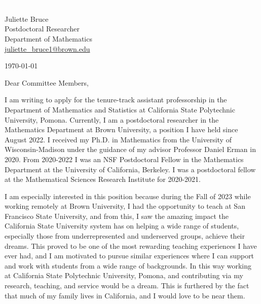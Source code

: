 \documentclass[11pt]{article}
\begin{document}
\section*{}

\noindent
\begin{minipage}{0.99\textwidth}
\begin{minipage}{0.69\textwidth}
\textcolor{white}{.}
\end{minipage}
\begin{minipage}{0.29\textwidth}
{
Juliette Bruce \\
Postdoctoral Researcher \\
Department of Mathematics \\
\href{mailto:juliette\_bruce1@brown.edu}{juliette\_bruce1@brown.edu}
}

\vspace{12pt}
\today
\end{minipage}
\end{minipage}


\vspace{12pt}
\noindent
Dear Committee Members,

I am writing to apply for the tenure-track assistant professorship in the Department of Mathematics and Statistics at California State Polytechnic University, Pomona. Currently, I am a postdoctoral researcher in the Mathematics Department at Brown University, a position I have held since August 2022. I received my Ph.D. in Mathematics from the University of Wisconsin-Madison under the guidance of my advisor Professor Daniel Erman in 2020. From 2020-2022 I was an NSF Postdoctoral Fellow in the Mathematics Department at the University of California, Berkeley. I was a postdoctoral fellow at the Mathematical Sciences Research Institute for 2020-2021.

I am especially interested in this position because during the Fall of 2023 while working remotely at Brown University, I had the opportunity to teach at San Francisco State University, and from this, I saw the amazing impact the California State University system has on helping a wide range of students, especially those from underrepresented and underserved groups, achieve their dreams. This proved to be one of the most rewarding teaching experiences I have ever had, and I am motivated to pursue similar experiences where I can support and work with students from a wide range of backgrounds.  In this way working at California State Polytechnic University, Pomona, and contributing via my research, teaching, and service would be a dream. This is furthered by the fact that much of my family lives in California, and I would love to be near them. 
\end{document}

